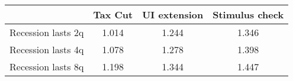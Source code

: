 \begin{tabular}{@{}lccc@{}}
\toprule
& Tax Cut    & UI extension    & Stimulus check    \\  \midrule
Recession lasts 2q &1.014  & 1.244  & 1.346     \\
Recession lasts 4q &1.078  & 1.278  & 1.398     \\
Recession lasts 8q &1.198  & 1.344  & 1.447     \\
\end{tabular}
